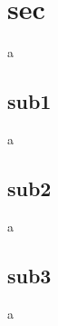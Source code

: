 \documentclass{beamer}
\begin{document}
\section{sec}
\begin{frame}a\end{frame}

\subsection{sub1}
\begin{frame}a\end{frame}

\subsection{sub2}
\begin{frame}a\end{frame}

\subsection{sub3}
\begin{frame}a\end{frame}
\end{document}
